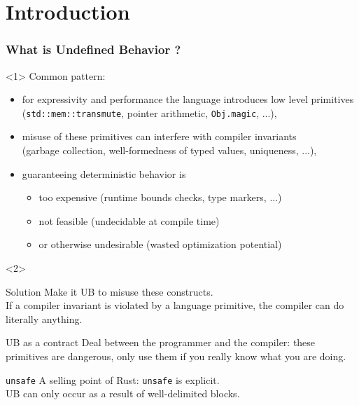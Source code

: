 \begin{frame}
    \titlepage
\end{frame}

\section{Introduction}


\begin{frame}[fragile, t]
    \frametitle{What is Undefined Behavior ?}

    \begin{onlyenv}<1>
        Common pattern:
        \begin{itemize}
            \item for expressivity and performance the language introduces low level primitives \\
                (\texttt{std::mem::transmute}, pointer arithmetic, \texttt{Obj.magic}, ...),
            \item misuse of these primitives can interfere with compiler invariants \\
                (garbage collection, well-formedness of typed values, uniqueness, ...),
            \item guaranteeing deterministic behavior is
                \begin{itemize}
                    \item too expensive
                        (runtime bounds checks, type markers, ...)
                    \item not feasible
                        (undecidable at compile time)
                    \item or otherwise undesirable
                        (wasted optimization potential)
                \end{itemize}
        \end{itemize}
    \end{onlyenv}

    \begin{onlyenv}<2>
        \begin{alertblock}{Solution}
            Make it UB to misuse these constructs.\\
            If a compiler invariant is violated by a language primitive, the compiler can do literally anything.
        \end{alertblock}
        \begin{block}{UB as a contract}
            Deal between the programmer and the compiler: these primitives are
            dangerous, only use them if you really know what you are doing.
        \end{block}
        \begin{exampleblock}{\texttt{unsafe}}
            A selling point of Rust: \texttt{unsafe} is explicit.\\
            UB can only occur as a result of well-delimited blocks.
        \end{exampleblock}
    \end{onlyenv}
\end{frame}

